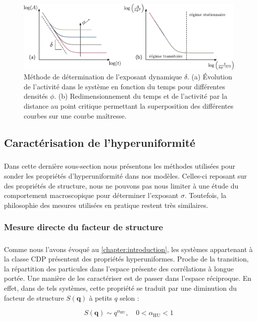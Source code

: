 \begin{figure}[h]
	\centering
	\includegraphics[width=\textwidth]{Chapitre2/Figures/Methodes/Delta.pdf}
	\caption{Méthode de détermination de l'exposant dynamique $\delta$. (a) Évolution de l'activité dans le système en fonction du temps pour différentes densités $\phi$. (b) Redimensionnement du temps et de l'activité par la distance au point critique permettant la superposition des différentes courbes sur une courbe maîtresse.}
	\label{fig:DeltaDeter}
\end{figure}

\subsection{Caractérisation de l'hyperuniformité}

\label{sec:MethodHU}

\subparagraph{}Dans cette dernière sous-section nous présentons les méthodes utilisées pour sonder les propriétés d'hyperuniformité dans nos modèles. Celles-ci reposant sur des propriétés de structure, nous ne pouvons pas nous limiter à une étude du comportement macroscopique pour déterminer l'exposant $\sigma$. Toutefois, la philosophie des mesures utilisées en pratique restent très similaires.

\subsubsection{Mesure directe du facteur de structure}

\subparagraph{}Comme nous l'avons évoqué au \autoref{chapter:introduction}, les systèmes appartenant à la classe CDP présentent des propriétés hyperuniformes. Proche de la transition, la répartition des particules dans l'espace présente des corrélations à longue portée. Une manière de les caractériser  est de passer dans l'espace réciproque. En effet, dans de tels systèmes, cette propriété se traduit par une diminution du facteur de structure $S(\mathbf{q})$ à petits $q$ selon :

\begin{equation}
	S(\mathbf{q})\sim q^{\alpha_\text{HU}}, \quad 0 < \alpha_\text{HU} < 1
\end{equation}

